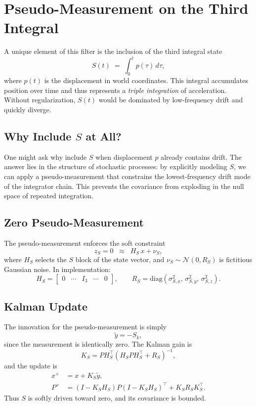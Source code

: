 \documentclass[10pt]{extarticle}
\begin{document}
\section{Pseudo-Measurement on the Third Integral}
\label{sec:pseudo-S}

A unique element of this filter is the inclusion of the third integral state
\[
S(t) \;=\; \int_0^t p(\tau)\,d\tau,
\]
where $p(t)$ is the displacement in world coordinates.
This integral accumulates position over time and thus represents a 
\emph{triple integration} of acceleration. Without regularization, $S(t)$
would be dominated by low-frequency drift and quickly diverge.

\subsection{Why Include $S$ at All?}
One might ask why include $S$ when displacement $p$ already contains drift.
The answer lies in the structure of stochastic processes: by explicitly modeling
$S$, we can apply a pseudo-measurement that constrains the lowest-frequency drift
mode of the integrator chain. This prevents the covariance from exploding in the
null space of repeated integration.

\subsection{Zero Pseudo-Measurement}
The pseudo-measurement enforces the soft constraint
\begin{equation}
z_S = 0 \;\;\approx\;\; H_S\,x + \nu_S,
\label{eq:ps-meas}
\end{equation}
where $H_S$ selects the $S$ block of the state vector, and $\nu_S\sim\mathcal{N}(0,R_S)$
is fictitious Gaussian noise. In implementation:
\begin{equation}
H_S = \begin{bmatrix}0 & \cdots & I_3 & \cdots & 0\end{bmatrix},
\qquad
R_S = \mathrm{diag}(\sigma_{S,x}^2,\,\sigma_{S,y}^2,\,\sigma_{S,z}^2).
\label{eq:ps-HR}
\end{equation}

\subsection{Kalman Update}
The innovation for the pseudo-measurement is simply
\begin{equation}
\tilde y = -S_k,
\end{equation}
since the measurement is identically zero. The Kalman gain is
\begin{equation}
K_S = P H_S^\top (H_S P H_S^\top + R_S)^{-1},
\end{equation}
and the update is
\begin{align}
x^+ &= x + K_S\tilde y,\\
P^+ &= (I-K_SH_S)P(I-K_SH_S)^\top + K_SR_SK_S^\top.
\end{align}
Thus $S$ is softly driven toward zero, and its covariance is bounded.
\end{document}
